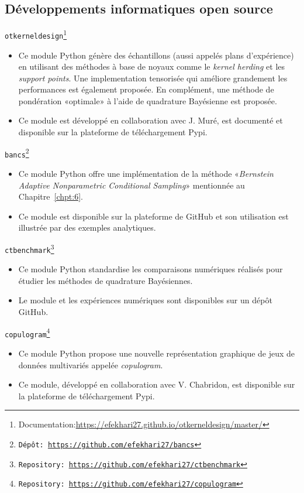 \vspace*{-10pt}
\subsection*{D\'{e}veloppements informatiques open source}
\noindent
\texttt{otkerneldesign}\footnote{Documentation:\url{https://efekhari27.github.io/otkerneldesign/master/}}
\begin{itemize}
    \item[\textbullet] Ce module Python g\'{e}nère des \'{e}chantillons (aussi appel\'{e}s plans d'exp\'{e}rience) en utilisant des m\'{e}thodes à base de noyaux comme le \textit{kernel herding} et les \textit{support points}. Une implementation tensoris\'{e}e qui am\'{e}liore grandement les performances est \'{e}galement propos\'{e}e. En compl\'{e}ment, une m\'{e}thode de pond\'{e}ration «optimale» à l'aide de quadrature Bay\'{e}sienne est propos\'{e}e. 
    \item[\textbullet] Ce module est d\'{e}velopp\'{e} en collaboration avec J. Mur\'{e}, est document\'{e} et disponible sur la plateforme de t\'{e}l\'{e}chargement Pypi.
\end{itemize}

\noindent
\texttt{bancs\footnote{D\'{e}pôt: \url{https://github.com/efekhari27/bancs}}}     
\begin{itemize}
    \item[\textbullet] Ce module Python offre une impl\'{e}mentation de la m\'{e}thode «\textit{Bernstein Adaptive Nonparametric Conditional Sampling}» mentionn\'{e}e au Chapitre~\ref{chpt:6}. 
    \item[\textbullet] Ce module est disponible sur la plateforme de GitHub et son utilisation est illustr\'{e}e par des exemples analytiques.
\end{itemize}

\noindent
\texttt{ctbenchmark\footnote{Repository: \url{https://github.com/efekhari27/ctbenchmark}}}    
\begin{itemize}
    \item[\textbullet] Ce module Python standardise les comparaisons num\'{e}riques r\'{e}alis\'{e}s pour \'{e}tudier les m\'{e}thodes de quadrature Bay\'{e}siennes.      
    \item[\textbullet] Le module et les exp\'{e}riences num\'{e}riques sont disponibles sur un d\'{e}pôt GitHub.
\end{itemize}

\noindent
\texttt{copulogram\footnote{Repository: \url{https://github.com/efekhari27/copulogram}}} 
\begin{itemize}
    \item[\textbullet] Ce module Python propose une nouvelle repr\'{e}sentation graphique de jeux de donn\'{e}es multivari\'{e}s appel\'{e}e \textit{copulogram}.
    \item[\textbullet] Ce module, d\'{e}velopp\'{e} en collaboration avec V. Chabridon, est disponible sur la plateforme de t\'{e}l\'{e}chargement Pypi.
\end{itemize}
